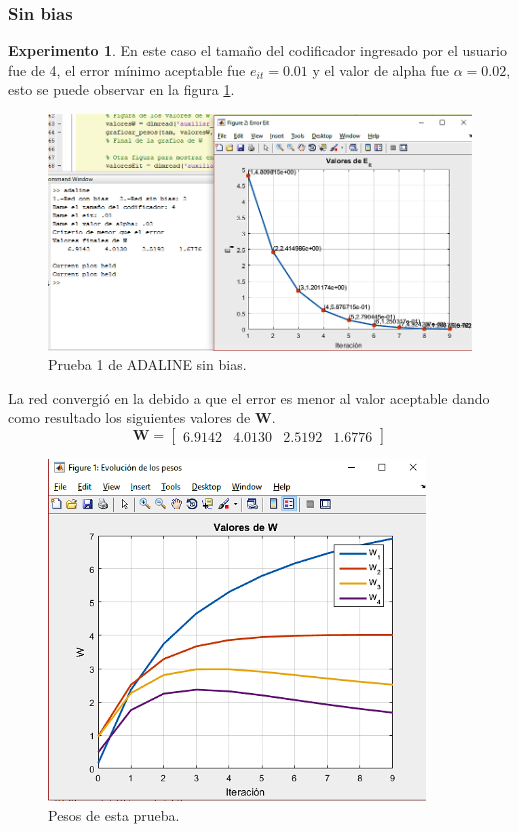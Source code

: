             \subsubsection{Sin bias}
            \textbf{Experimento 1}. En este caso el tamaño del codificador ingresado por el usuario fue de 4, el error mínimo aceptable fue $e_{it} = 0.01$ y el valor de alpha fue $\alpha=0.02$, esto se puede observar en la figura \ref{fig:adaline3error}.
            \begin{figure}[H]
                \begin{center}
                    \includegraphics[width=16cm]{img/adaline3/error.png}
                    \caption{Prueba 1 de ADALINE sin bias.}
                    \label{fig:adaline3error}
                \end{center}
            \end{figure}
            La red convergió en la debido a que el error es menor al valor aceptable dando como resultado los siguientes valores de $\boldsymbol{W}$.
            \[ \boldsymbol{W} = \left[\begin{array}{cccc}6.9142 & 4.0130 & 2.5192 & 1.6776\end{array}\right] \]
            \begin{figure}[H]
                \begin{center}
                    \includegraphics[width=10cm]{img/adaline3/pesosbias.png}
                    \caption{Pesos de esta prueba.}
                    \label{fig:adaline3pesos}
                \end{center}
            \end{figure}
